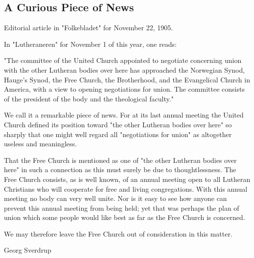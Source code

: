 
\subsection{A Curious Piece of News}

Editorial article in "Folkebladet" for November 22, 1905.

In "Lutheraneren" for November 1 of this year, one reads:

"The committee of the United Church appointed to negotiate concerning union with the other Lutheran bodies over here has approached the Norwegian Synod, Hauge's Synod, the Free Church, the Brotherhood, and the Evangelical Church in America, with a view to opening negotiations for union. The committee consists of the president of the body and the theological faculty."

We call it a remarkable piece of news. For at its last annual meeting the United Church defined its position toward "the other Lutheran bodies over here" so sharply that one might well regard all "negotiations for union" as altogether useless and meaningless.

That the Free Church is mentioned as one of "the other Lutheran bodies over here" in such a connection as this must surely be due to thoughtlessness. The Free Church consists, as is well known, of an annual meeting open to all Lutheran Christians who will cooperate for free and living congregations. With this annual meeting no body can very well unite. Nor is it easy to see how anyone can prevent this annual meeting from being held; yet that was perhaps the plan of union which some people would like best as far as the Free Church is concerned.

We may therefore leave the Free Church out of consideration in this matter.

Georg Sverdrup
